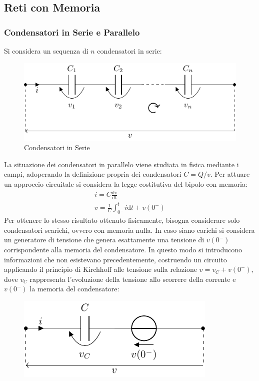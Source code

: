 \documentclass{article}
\newcommand{\df}{\mathrm{d}}
\numberwithin{equation}{subsection}
\begin{document}
\subsection{Reti con Memoria}

\subsubsection{Condensatori in Serie e Parallelo}

Si considera un sequenza di $n$ condensatori in serie:

\begin{figure}[H]%
    \centering
    \includegraphics{condensatore-serie.pdf}%
    \caption{Condensatori in Serie}
    \label{fig:condensatore-serie}
\end{figure}

La situazione dei condensatori in parallelo viene studiata in fisica mediante i campi, adoperando la definizione propria dei condensatori $C=Q/v$. Per attuare un approccio 
circuitale si considera la legge costitutiva del bipolo con memoria:
\begin{gather*}
    i=C\displaystyle\frac{\df v}{\df t}\\
    v=\displaystyle\frac{1}{C}\int_{0^-}^ti\df t+v(0^-)
\end{gather*}
Per ottenere lo stesso risultato ottenuto fisicamente, bisogna considerare solo condensatori scarichi, ovvero con memoria nulla. In caso siano carichi si considera un 
generatore di tensione che genera esattamente una tensione di $v(0^-)$ corrispondente alla memoria del condensatore. In questo modo si introducono informazioni che non 
esistevano precedentemente, costruendo un circuito applicando il principio di Kirchhoff alle tensione sulla relazione $v=v_C+v(0^-)$, dove $v_C$ rappresenta l'evoluzione 
della tensione allo scorrere della corrente e $v(0^-)$ la memoria del condensatore:

\begin{figure}[H]%
    \centering
    \includegraphics{condensatore-memoria.pdf}%
    \label{fig:condensatore-memoria}
\end{figure}
\end{document}
